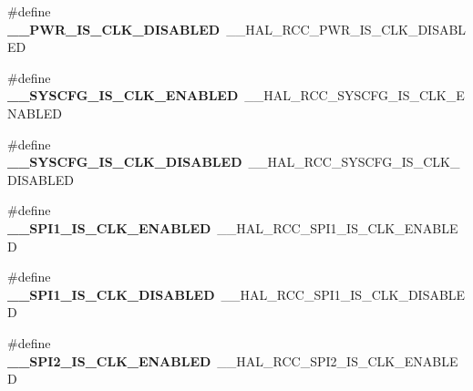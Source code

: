 \begin{DoxyCompactItemize}
\item 
\hypertarget{group___h_a_l___r_c_c___aliased_gaa01b51b10e9f5ff9335ea6108c09fa0a}{\#define {\bfseries \-\_\-\-\_\-\-P\-W\-R\-\_\-\-I\-S\-\_\-\-C\-L\-K\-\_\-\-D\-I\-S\-A\-B\-L\-E\-D}~\-\_\-\-\_\-\-H\-A\-L\-\_\-\-R\-C\-C\-\_\-\-P\-W\-R\-\_\-\-I\-S\-\_\-\-C\-L\-K\-\_\-\-D\-I\-S\-A\-B\-L\-E\-D}\label{group___h_a_l___r_c_c___aliased_gaa01b51b10e9f5ff9335ea6108c09fa0a}

\item 
\hypertarget{group___h_a_l___r_c_c___aliased_ga16af3115d73d7dff282a9ccb86b3ea63}{\#define {\bfseries \-\_\-\-\_\-\-S\-Y\-S\-C\-F\-G\-\_\-\-I\-S\-\_\-\-C\-L\-K\-\_\-\-E\-N\-A\-B\-L\-E\-D}~\-\_\-\-\_\-\-H\-A\-L\-\_\-\-R\-C\-C\-\_\-\-S\-Y\-S\-C\-F\-G\-\_\-\-I\-S\-\_\-\-C\-L\-K\-\_\-\-E\-N\-A\-B\-L\-E\-D}\label{group___h_a_l___r_c_c___aliased_ga16af3115d73d7dff282a9ccb86b3ea63}

\item 
\hypertarget{group___h_a_l___r_c_c___aliased_gadde476f7114c1e6239bda846adbb9c3c}{\#define {\bfseries \-\_\-\-\_\-\-S\-Y\-S\-C\-F\-G\-\_\-\-I\-S\-\_\-\-C\-L\-K\-\_\-\-D\-I\-S\-A\-B\-L\-E\-D}~\-\_\-\-\_\-\-H\-A\-L\-\_\-\-R\-C\-C\-\_\-\-S\-Y\-S\-C\-F\-G\-\_\-\-I\-S\-\_\-\-C\-L\-K\-\_\-\-D\-I\-S\-A\-B\-L\-E\-D}\label{group___h_a_l___r_c_c___aliased_gadde476f7114c1e6239bda846adbb9c3c}

\item 
\hypertarget{group___h_a_l___r_c_c___aliased_gafea44feca9f74b3fa277a00c482b3be4}{\#define {\bfseries \-\_\-\-\_\-\-S\-P\-I1\-\_\-\-I\-S\-\_\-\-C\-L\-K\-\_\-\-E\-N\-A\-B\-L\-E\-D}~\-\_\-\-\_\-\-H\-A\-L\-\_\-\-R\-C\-C\-\_\-\-S\-P\-I1\-\_\-\-I\-S\-\_\-\-C\-L\-K\-\_\-\-E\-N\-A\-B\-L\-E\-D}\label{group___h_a_l___r_c_c___aliased_gafea44feca9f74b3fa277a00c482b3be4}

\item 
\hypertarget{group___h_a_l___r_c_c___aliased_ga6b94e6985c6bb5875d23a5368294a74f}{\#define {\bfseries \-\_\-\-\_\-\-S\-P\-I1\-\_\-\-I\-S\-\_\-\-C\-L\-K\-\_\-\-D\-I\-S\-A\-B\-L\-E\-D}~\-\_\-\-\_\-\-H\-A\-L\-\_\-\-R\-C\-C\-\_\-\-S\-P\-I1\-\_\-\-I\-S\-\_\-\-C\-L\-K\-\_\-\-D\-I\-S\-A\-B\-L\-E\-D}\label{group___h_a_l___r_c_c___aliased_ga6b94e6985c6bb5875d23a5368294a74f}

\item 
\hypertarget{group___h_a_l___r_c_c___aliased_ga8642a600a9a3192b876e4b65daa00b54}{\#define {\bfseries \-\_\-\-\_\-\-S\-P\-I2\-\_\-\-I\-S\-\_\-\-C\-L\-K\-\_\-\-E\-N\-A\-B\-L\-E\-D}~\-\_\-\-\_\-\-H\-A\-L\-\_\-\-R\-C\-C\-\_\-\-S\-P\-I2\-\_\-\-I\-S\-\_\-\-C\-L\-K\-\_\-\-E\-N\-A\-B\-L\-E\-D}\label{group___h_a_l___r_c_c___aliased_ga8642a600a9a3192b876e4b65daa00b54}


\end{DoxyCompactItemize}
